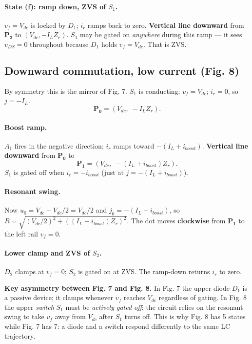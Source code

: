 \documentclass[12pt, a4paper]{article}
\def\,{ }%
\newcommand{\Vdc}{V_{dc}}
\newcommand{\ir}{i_r}
\newcommand{\IL}{I_L}
\begin{document}
\paragraph{State (f): ramp down, ZVS of $S_1$.}
$v_f = \Vdc$ is locked by $D_1$; $\ir$ ramps back to zero.
\textbf{Vertical line downward} from $\mathbf{P_2}$ to
$(\Vdc, -\IL Z_r)$.
$S_1$ may be gated on \emph{anywhere} during this ramp --- it sees
$v_{DS} = 0$ throughout because $D_1$ holds $v_f = \Vdc$.
That is ZVS.

\subsection{Downward commutation, low current (Fig.\,8)}
\label{ssec:pp_fig8}

By symmetry this is the mirror of Fig.\,7.
$S_1$ is conducting; $v_f = \Vdc$; $\ir = 0$, so $j = -\IL$.
\[
    \mathbf{P_0} = (\Vdc,\; -\IL Z_r).
\]

\paragraph{Boost ramp.}
$A_1$ fires in the negative direction; $\ir$ ramps toward $-(I_L + i_{boost})$.
\textbf{Vertical line downward} from $\mathbf{P_0}$ to
\[
    \mathbf{P_1} = (\Vdc,\; -(I_L+i_{boost})\,Z_r).
\]
$S_1$ is gated off when $\ir = -i_{boost}$ (just at $j = -(I_L+i_{boost})$).

\paragraph{Resonant swing.}
Now $u_0 = \Vdc - \Vdc/2 = \Vdc/2$ and
$j_0 = -(I_L + i_{boost})$, so
$R = \sqrt{(\Vdc/2)^2 + ((I_L+i_{boost})Z_r)^2}$.
The dot moves \textbf{clockwise} from $\mathbf{P_1}$ to
the left rail $v_f = 0$.

\paragraph{Lower clamp and ZVS of $S_2$.}
$D_2$ clamps at $v_f = 0$; $S_2$ is gated on at ZVS.
The ramp-down returns $\ir$ to zero.

\medskip\noindent
\textbf{Key asymmetry between Fig.\,7 and Fig.\,8.}
In Fig.\,7 the upper diode $D_1$ is a passive device; it clamps whenever
$v_f$ reaches $\Vdc$ regardless of gating.
In Fig.\,8 the upper \emph{switch} $S_1$ must be \emph{actively gated off};
the circuit relies on the resonant swing to take $v_f$ away from $\Vdc$
after $S_1$ turns off.
This is why Fig.\,8 has 5 states while Fig.\,7 has 7: a diode and a switch
respond differently to the same LC trajectory.
\end{document}
